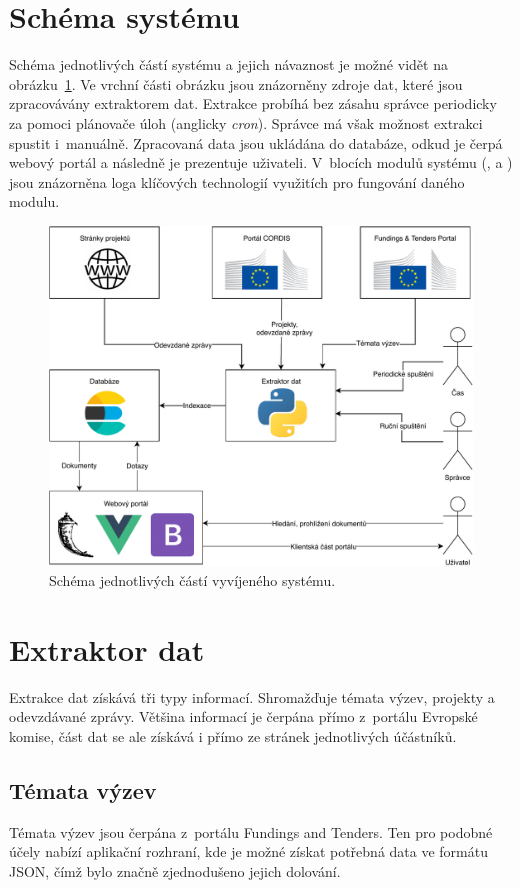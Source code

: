 \section{Schéma systému}
Schéma jednotlivých částí systému a jejich návaznost je možné vidět na obrázku~\ref{img:scheme}. Ve vrchní části obrázku jsou znázorněny zdroje dat, které jsou zpracovávány extraktorem dat. Extrakce probíhá bez zásahu správce periodicky za pomoci plánovače úloh (anglicky \emph{cron}). Správce má však možnost extrakci spustit i~manuálně. Zpracovaná data jsou ukládána do databáze, odkud je čerpá webový portál a následně je prezentuje uživateli. V~blocích modulů systému (,  a ) jsou znázorněna loga klíčových technologií využitích pro fungování daného modulu.

\begin{figure}[H]
	\centering
	\includegraphics[width=\textwidth]{obrazky-figures/my-scheme.pdf}
	\caption{Schéma jednotlivých částí vyvíjeného systému.}
	\label{img:scheme}
\end{figure}

\section{Extraktor dat}
Extrakce dat získává tři typy informací. Shromažďuje témata výzev, projekty a odevzdávané zprávy. Většina informací je čerpána přímo z~portálu Evropské komise, část dat se ale získává i přímo ze stránek jednotlivých účástníků.

\subsection{Témata výzev}
Témata výzev jsou čerpána z~portálu Fundings and Tenders.
Ten pro podobné účely nabízí aplikační rozhraní, kde je možné získat potřebná data ve formátu JSON, čímž bylo značně zjednodušeno jejich dolování. 

